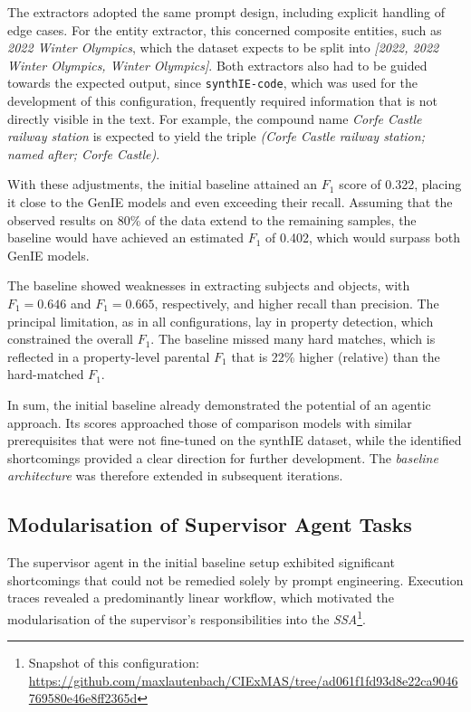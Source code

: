 \documentclass[a4paper,oneside,bibliography=totoc]{scrbook}
\begin{document}
The extractors adopted the same prompt design, including explicit handling of edge cases. For the entity extractor, this concerned composite entities, such as \textit{2022 Winter Olympics}, which the dataset expects to be split into \textit{[2022, 2022 Winter Olympics, Winter Olympics]}. Both extractors also had to be guided towards the expected output, since \texttt{synthIE-code}, which was used for the development of this configuration, frequently required information that is not directly visible in the text. For example, the compound name \textit{Corfe Castle railway station} is expected to yield the triple \textit{(Corfe Castle railway station; named after; Corfe Castle)}.

With these adjustments, the initial baseline attained an $F_{1}$ score of 0.322, placing it close to the GenIE models and even exceeding their recall. Assuming that the observed results on 80\% of the data extend to the remaining samples, the baseline would have achieved an estimated $F_{1}$ of 0.402, which would surpass both GenIE models.

The baseline showed weaknesses in extracting subjects and objects, with $F_{1}=0.646$ and $F_{1}=0.665$, respectively, and higher recall than precision. The principal limitation, as in all configurations, lay in property detection, which constrained the overall $F_{1}$. The baseline missed many hard matches, which is reflected in a property-level parental $F_{1}$ that is 22\% higher (relative) than the hard-matched $F_{1}$.

In sum, the initial baseline already demonstrated the potential of an agentic approach. Its scores approached those of comparison models with similar prerequisites that were not fine-tuned on the synthIE dataset, while the identified shortcomings provided a clear direction for further development. The \textit{baseline architecture} was therefore extended in subsequent iterations.

\subsection{Modularisation of Supervisor Agent Tasks}
\label{subsec:modularization_agent_tasks}

The supervisor agent in the initial baseline setup exhibited significant shortcomings that could not be remedied solely by prompt engineering. Execution traces revealed a predominantly linear workflow, which motivated the modularisation of the supervisor's responsibilities into the \textit{\ac{SSA}}\footnote{Snapshot of this configuration: \url{https://github.com/maxlautenbach/CIExMAS/tree/ad061f1fd93d8e22ca9046769580e46e8ff2365d}}.
\end{document}
